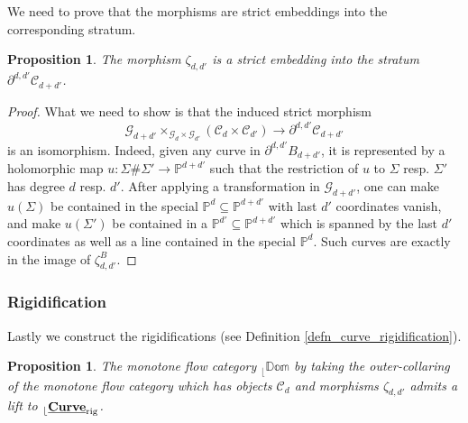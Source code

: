 \documentclass[reqno, 10pt]{amsart}
\numberwithin{equation}{section}
\numberwithin{equation}{section}
\renewcommand{\subset}{\subseteq}
\newtheorem{prop}[thm]{Proposition}
\theoremstyle{definition}
\theoremstyle{remark}
\newcommand{\beqn}{\begin{equation*}}
\newcommand{\eeqn}{\end{equation*}}
\newcommand{\mb}{\mathbb}
\newcommand{\mc}{\mathcal}
\renewcommand{\outer}{{}_{\lfloor}}
\newcommand{\uds}[1]{\underline{\smash{#1}}}
\begin{document}
We need to prove that the morphisms are strict embeddings into the corresponding stratum.

\begin{prop}
The morphism $\zeta_{d, d'}$ is a strict embedding into the stratum $\partial^{d, d'} {\mc C}_{d + d'} $.
\end{prop}

\begin{proof}
What we need to show is that the induced strict morphism 
\beqn
{\mc G}_{d + d'}  \times_{{\mc G}_d  \times {\mc G}_{d'} } \left( {\mc C}_{d}  \times {\mc C}_{d'}   \right) \to \partial^{d, d'} {\mc C}_{d + d'} 
\eeqn
is an isomorphism. Indeed, given any curve in $\partial^{d, d'} B_{d + d'} $, it is represented by a holomorphic map $u: \Sigma \# \Sigma' \to \mb{P}^{d + d'}$ such that the restriction of $u$ to $\Sigma$ resp. $\Sigma'$ has degree $d$ resp. $d'$. After applying a transformation in ${\mc G}_{d + d'} $, one can make $u(\Sigma)$ be contained in the special ${\mb P}^d \subset {\mb P}^{d + d'}$ with last $d'$ coordinates vanish, and make $u(\Sigma')$ be contained in a ${\mb P}^{d'} \subset {\mb P}^{d + d'}$ which is spanned by the last $d'$ coordinates as well as a line contained in the special ${\mb P}^d$. Such curves are exactly in the image of $\zeta_{d, d'}^B$. 
\end{proof}


\subsubsection{Rigidification}

Lastly we construct the rigidifications (see Definition \ref{defn_curve_rigidification}).

\begin{prop}\label{prop_curve_rigidification}
The monotone flow category $\outer \mb{Dom}$ by taking the outer-collaring of the monotone flow category which has objects ${\mc C}_d$ and morphisms $\zeta_{d, d'}$ admits a lift to $\outer \uds{\bf Curve}_{\rm rig}$. 
\end{prop}
\end{document}

